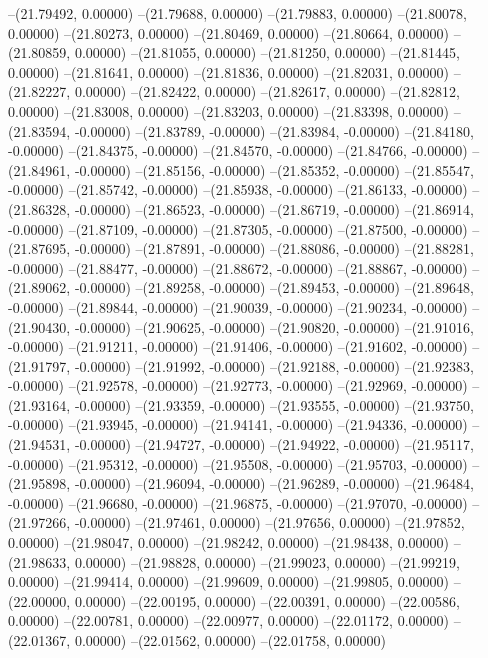 --(21.79492, 0.00000)
--(21.79688, 0.00000)
--(21.79883, 0.00000)
--(21.80078, 0.00000)
--(21.80273, 0.00000)
--(21.80469, 0.00000)
--(21.80664, 0.00000)
--(21.80859, 0.00000)
--(21.81055, 0.00000)
--(21.81250, 0.00000)
--(21.81445, 0.00000)
--(21.81641, 0.00000)
--(21.81836, 0.00000)
--(21.82031, 0.00000)
--(21.82227, 0.00000)
--(21.82422, 0.00000)
--(21.82617, 0.00000)
--(21.82812, 0.00000)
--(21.83008, 0.00000)
--(21.83203, 0.00000)
--(21.83398, 0.00000)
--(21.83594, -0.00000)
--(21.83789, -0.00000)
--(21.83984, -0.00000)
--(21.84180, -0.00000)
--(21.84375, -0.00000)
--(21.84570, -0.00000)
--(21.84766, -0.00000)
--(21.84961, -0.00000)
--(21.85156, -0.00000)
--(21.85352, -0.00000)
--(21.85547, -0.00000)
--(21.85742, -0.00000)
--(21.85938, -0.00000)
--(21.86133, -0.00000)
--(21.86328, -0.00000)
--(21.86523, -0.00000)
--(21.86719, -0.00000)
--(21.86914, -0.00000)
--(21.87109, -0.00000)
--(21.87305, -0.00000)
--(21.87500, -0.00000)
--(21.87695, -0.00000)
--(21.87891, -0.00000)
--(21.88086, -0.00000)
--(21.88281, -0.00000)
--(21.88477, -0.00000)
--(21.88672, -0.00000)
--(21.88867, -0.00000)
--(21.89062, -0.00000)
--(21.89258, -0.00000)
--(21.89453, -0.00000)
--(21.89648, -0.00000)
--(21.89844, -0.00000)
--(21.90039, -0.00000)
--(21.90234, -0.00000)
--(21.90430, -0.00000)
--(21.90625, -0.00000)
--(21.90820, -0.00000)
--(21.91016, -0.00000)
--(21.91211, -0.00000)
--(21.91406, -0.00000)
--(21.91602, -0.00000)
--(21.91797, -0.00000)
--(21.91992, -0.00000)
--(21.92188, -0.00000)
--(21.92383, -0.00000)
--(21.92578, -0.00000)
--(21.92773, -0.00000)
--(21.92969, -0.00000)
--(21.93164, -0.00000)
--(21.93359, -0.00000)
--(21.93555, -0.00000)
--(21.93750, -0.00000)
--(21.93945, -0.00000)
--(21.94141, -0.00000)
--(21.94336, -0.00000)
--(21.94531, -0.00000)
--(21.94727, -0.00000)
--(21.94922, -0.00000)
--(21.95117, -0.00000)
--(21.95312, -0.00000)
--(21.95508, -0.00000)
--(21.95703, -0.00000)
--(21.95898, -0.00000)
--(21.96094, -0.00000)
--(21.96289, -0.00000)
--(21.96484, -0.00000)
--(21.96680, -0.00000)
--(21.96875, -0.00000)
--(21.97070, -0.00000)
--(21.97266, -0.00000)
--(21.97461, 0.00000)
--(21.97656, 0.00000)
--(21.97852, 0.00000)
--(21.98047, 0.00000)
--(21.98242, 0.00000)
--(21.98438, 0.00000)
--(21.98633, 0.00000)
--(21.98828, 0.00000)
--(21.99023, 0.00000)
--(21.99219, 0.00000)
--(21.99414, 0.00000)
--(21.99609, 0.00000)
--(21.99805, 0.00000)
--(22.00000, 0.00000)
--(22.00195, 0.00000)
--(22.00391, 0.00000)
--(22.00586, 0.00000)
--(22.00781, 0.00000)
--(22.00977, 0.00000)
--(22.01172, 0.00000)
--(22.01367, 0.00000)
--(22.01562, 0.00000)
--(22.01758, 0.00000)
